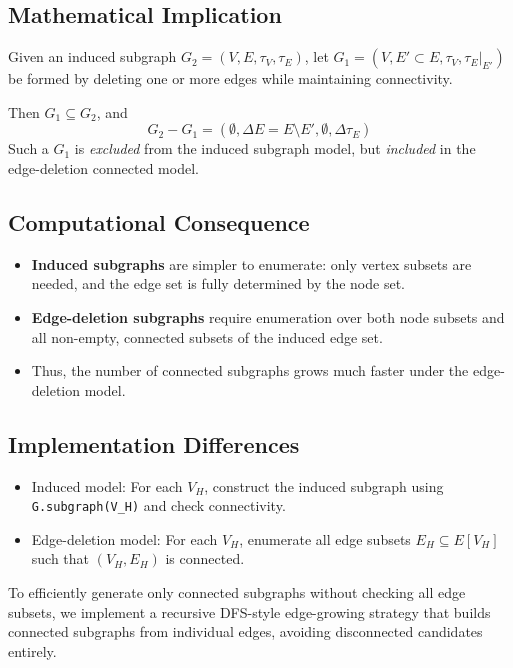 \documentclass{article}
\begin{document}
\subsection*{Mathematical Implication}

Given an induced subgraph \( G_2 = (V, E, \tau_V, \tau_E) \), let \( G_1 = (V, E' \subset E, \tau_V, \tau_E|_{E'}) \) be formed by deleting one or more edges while maintaining connectivity.

Then \( G_1 \subseteq G_2 \), and
\[
G_2 - G_1 = (\emptyset, \Delta E = E \setminus E', \emptyset, \Delta \tau_E)
\]
Such a \( G_1 \) is \emph{excluded} from the induced subgraph model, but \emph{included} in the edge-deletion connected model.

\subsection*{Computational Consequence}

\begin{itemize}
    \item \textbf{Induced subgraphs} are simpler to enumerate: only vertex subsets are needed, and the edge set is fully determined by the node set.
    \item \textbf{Edge-deletion subgraphs} require enumeration over both node subsets and all non-empty, connected subsets of the induced edge set.
    \item Thus, the number of connected subgraphs grows much faster under the edge-deletion model.
\end{itemize}

\subsection*{Implementation Differences}

\begin{itemize}
    \item Induced model: For each \( V_H \), construct the induced subgraph using \texttt{G.subgraph(V\_H)} and check connectivity.
    \item Edge-deletion model: For each \( V_H \), enumerate all edge subsets \( E_H \subseteq E[V_H] \) such that \( (V_H, E_H) \) is connected.
\end{itemize}

To efficiently generate only connected subgraphs without checking all edge subsets, we implement a recursive DFS-style edge-growing strategy that builds connected subgraphs from individual edges, avoiding disconnected candidates entirely.
\end{document}
